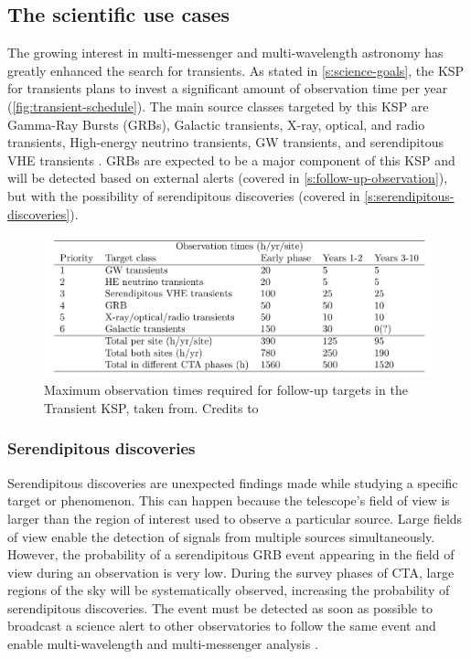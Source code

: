 \subsection{The scientific use cases}
\label{s:contribution-1-use-cases}
The growing interest in multi-messenger and multi-wavelength astronomy has greatly enhanced the search for transients. As stated in \autoref{s:science-goals}, the KSP for transients plans to invest a significant amount of observation time per year (\autoref{fig:transient-schedule}). The main source classes targeted by this KSP are Gamma-Ray Bursts (GRBs), Galactic transients, X-ray, optical, and radio transients, High-energy neutrino transients, GW transients, and serendipitous VHE transients \cite{ScienceWithCherenkovTelescopeArray2018}. GRBs are expected to be a major component of this KSP and will be detected based on external alerts (covered in \autoref{s:follow-up-observation}), but with the possibility of serendipitous discoveries (covered in \autoref{s:serendipitous-discoveries}).
\begin{figure}[!h]
\centering
\includegraphics[width=0.9\linewidth]{figures/introduction/transients-schedule.png}
\caption{Maximum observation times required for follow-up targets in the Transient KSP, taken from. Credits to \cite{di2020detection}}
\label{fig:transient-schedule}
\end{figure}

\subsubsection{Serendipitous discoveries}
\label{s:serendipitous-discoveries}
Serendipitous discoveries are unexpected findings made while studying a specific target or phenomenon. This can happen because the telescope's field of view is larger than the region of interest used to observe a particular source. Large fields of view enable the detection of signals from multiple sources simultaneously. However, the probability of a serendipitous GRB event appearing in the field of view during an observation is very low. During the survey phases of CTA, large regions of the sky will be systematically observed, increasing the probability of serendipitous discoveries. The event must be detected as soon as possible to broadcast a science alert to other observatories to follow the same event and enable multi-wavelength and multi-messenger analysis \cite{bulgarelli2015on}. 

